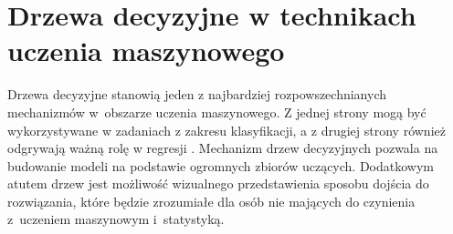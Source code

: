 \section{Drzewa decyzyjne w technikach uczenia maszynowego}

Drzewa decyzyjne stanowią jeden z najbardziej rozpowszechnianych mechanizmów w~obszarze uczenia maszynowego. Z jednej strony mogą być wykorzystywane w zadaniach z zakresu klasyfikacji, a z drugiej strony również odgrywają ważną rolę w regresji \cite{book_1}. Mechanizm drzew decyzyjnych pozwala na budowanie modeli na podstawie ogromnych zbiorów uczących. Dodatkowym atutem drzew jest możliwość wizualnego przedstawienia sposobu dojścia do rozwiązania, które będzie zrozumiałe dla osób nie mających do czynienia z~uczeniem maszynowym i~statystyką.


